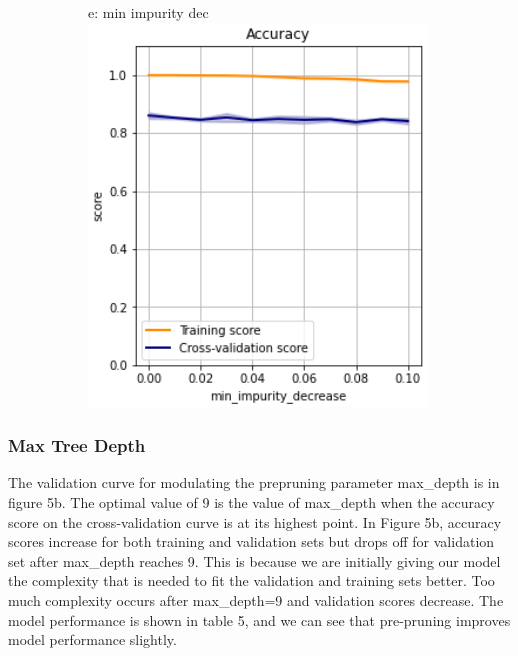 \documentclass{article}
\begin{document}
\begin{figure}
\begin{subfigure}{.19\textwidth}
	\end{subfigure}
	\begin{subfigure}{.19\textwidth}
		\centering
		e: min impurity dec\\
		\includegraphics[width=\linewidth]{poland_xgb_min_impurity_decrease_accuracy.png}
		
	\end{subfigure}

	\label{fig:test}
\end{figure}


\subsubsection*{Max Tree Depth}
The validation curve for modulating the prepruning parameter max\_depth is in figure 5b. The optimal value of 9 is the value of max\_depth when the accuracy score on the cross-validation curve is at its highest point. In Figure 5b, accuracy scores increase for both training and validation sets but drops off for validation set after max\_depth reaches 9. This is because we are initially giving our model the complexity that is needed to fit the validation and training sets better. Too much complexity occurs after max\_depth=9 and validation scores decrease. The model performance is shown in table 5, and we can see that pre-pruning improves model performance slightly. 
\end{document}
